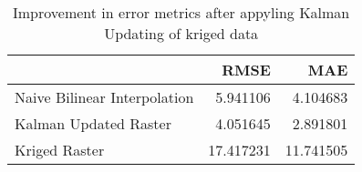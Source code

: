 \begin{table}
\caption{Improvement in error metrics after appyling Kalman Updating of kriged data}
\label{tab:oahu2_lidar_error}
\begin{tabular}{lrr}
\toprule
 & RMSE & MAE \\
\midrule
Naive Bilinear Interpolation & 5.941106 & 4.104683 \\
Kalman Updated Raster & 4.051645 & 2.891801 \\
Kriged Raster & 17.417231 & 11.741505 \\
\bottomrule
\end{tabular}
\end{table}
